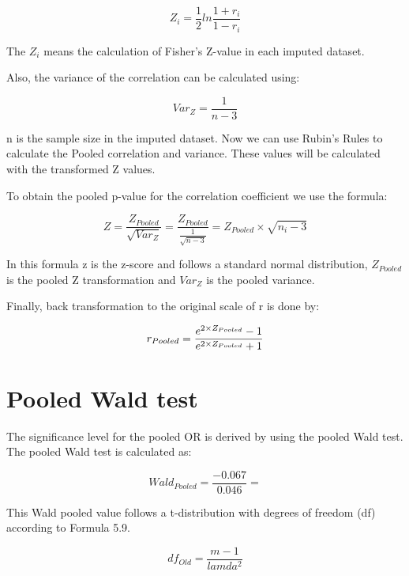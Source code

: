 \documentclass[]{book}
\begin{document}
\begin{equation}
Z_i = \frac{1}{2}ln\frac{1+r_i}{1-r_i}
  \label{eq:cor}
\end{equation}

The \({Z_i}\) means the calculation of Fisher's Z-value in each imputed
dataset.

Also, the variance of the correlation can be calculated using:

\begin{equation}
Var_Z=\frac{1}{n-3}
  \label{eq:var-cor}
\end{equation}

n is the sample size in the imputed dataset. Now we can use Rubin's
Rules to calculate the Pooled correlation and variance. These values
will be calculated with the transformed Z values.

To obtain the pooled p-value for the correlation coefficient we use the
formula:

\begin{equation}
Z=\frac{Z_{Pooled}}{\sqrt{Var_Z}} = \frac{Z_{Pooled}}{\frac{1}{\sqrt{n-3}}}=Z_{Pooled}\times\sqrt{n_i-3}
  \label{eq:z-cor}
\end{equation}

In this formula z is the z-score and follows a standard normal
distribution, \(Z_{Pooled}\) is the pooled Z transformation and
\(Var_Z\) is the pooled variance.

Finally, back transformation to the original scale of r is done by:

\begin{equation}
r_{Pooled} = \frac{e^{2\times\\Z_{Pooled}}-1}{e^{2\times\\Z_{Pooled}}+1}
  \label{eq:exp-cor}
\end{equation}

\section{Pooled Wald test}\label{pooled-wald-test}

The significance level for the pooled OR is derived by using the pooled
Wald test. The pooled Wald test is calculated as:

\[Wald_{Pooled} =\frac{-0.067}{0.046}=\]

This Wald pooled value follows a t-distribution with degrees of freedom
(df) according to Formula 5.9.

\[df_{Old} = \frac{m-1}{lamda^2}\]
\end{document}
